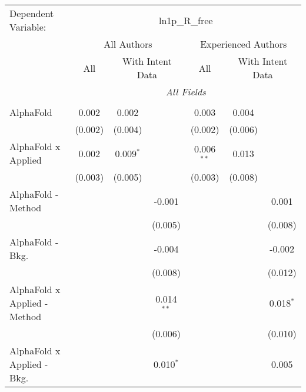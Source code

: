 \begingroup
\centering
\begin{tabular}{lcccccc}
   \tabularnewline \midrule \midrule
   Dependent Variable: & \multicolumn{6}{c}{ln1p\_R\_free}\\
 & \multicolumn{3}{c}{All Authors} & \multicolumn{3}{c}{Experienced Authors} \\
\cmidrule(lr){2-4} \cmidrule(lr){5-7}
 & \multicolumn{1}{c}{All} & \multicolumn{2}{c}{With Intent Data} & \multicolumn{1}{c}{All} & \multicolumn{2}{c}{With Intent Data} \\
\cmidrule(lr){2-2} \cmidrule(lr){3-4} \cmidrule(lr){5-5} \cmidrule(lr){6-7}
 & \multicolumn{6}{c}{\textit{All Fields}} \\ \\
   AlphaFold                      & 0.002         & 0.002          &               & 0.003         & 0.004          &   \\   
                                  & (0.002)       & (0.004)        &               & (0.002)       & (0.006)        &   \\   
   AlphaFold x Applied            & 0.002         & 0.009$^{*}$    &               & 0.006$^{**}$  & 0.013          &   \\   
                                  & (0.003)       & (0.005)        &               & (0.003)       & (0.008)        &   \\   
   AlphaFold - Method             &               &                & -0.001        &               &                & 0.001\\   
                                  &               &                & (0.005)       &               &                & (0.008)\\   
   AlphaFold - Bkg.               &               &                & -0.004        &               &                & -0.002\\   
                                  &               &                & (0.008)       &               &                & (0.012)\\   
   AlphaFold x Applied - Method   &               &                & 0.014$^{**}$  &               &                & 0.018$^{*}$\\   
                                  &               &                & (0.006)       &               &                & (0.010)\\   
   AlphaFold x Applied - Bkg.     &               &                & 0.010$^{*}$   &               &                & 0.005\\   

\end{tabular}
